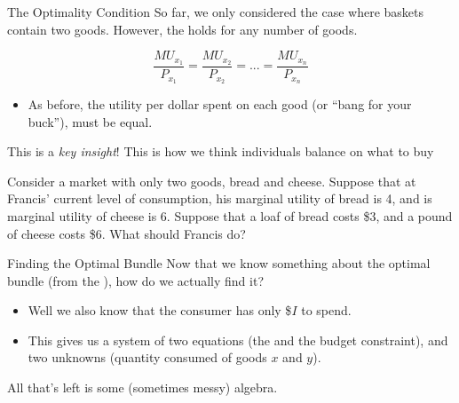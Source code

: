 \documentclass[12pt,t]{beamer}
\begin{document}
\begin{frame}{The Optimality Condition}
  So far, we only considered the case where baskets contain two goods. However, the  holds for any number of goods.

  $$
    \frac{MU_{x_1}}{P_{x_1}}=\frac{MU_{x_2}}{P_{x_2}}=...=\frac{MU_{x_n}}{P_{x_n}}
  $$

  \begin{itemize}
    \item As before, the utility per dollar spent on each good (or ``bang for your buck''), must be equal.
  \end{itemize}

  \pause\bigskip
  \begin{center}
    This is a \emph {key insight}! This  is how we think individuals balance  on what to buy
  \end{center}
\end{frame}

\begin{frame}

  \bigskip
  Consider a market with only two goods, bread and cheese. Suppose that at Francis' current level of consumption, his marginal utility of bread is 4, and is marginal utility of cheese is 6. Suppose that a loaf of bread costs \$3, and a pound of cheese costs \$6. What should Francis do?

\end{frame}

\begin{frame}{Finding the Optimal Bundle}
  Now that we know something about the optimal bundle (from the ), how do we actually find it?

  \begin{itemize}
    \item Well we also know that the consumer has only  \$$I$ to spend.

    \item This gives us a system of two equations (the  and the budget constraint), and two unknowns (quantity consumed of goods $x$ and $y$).

  \end{itemize}
  
  \pause\bigskip
  All that's left is some (sometimes messy) algebra.
\end{frame}
\end{document}
